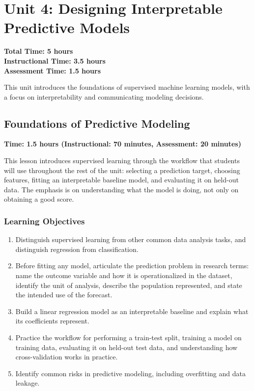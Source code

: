 \chapter{Unit 4: Designing Interpretable Predictive Models}
\label{chap:unit4}

\textbf{Total Time: 5 hours} \\
\textbf{Instructional Time: 3.5 hours} \\
\textbf{Assessment Time: 1.5 hours}

This unit introduces the foundations of supervised machine learning models, with a focus on interpretability and communicating modeling decisions.

\section{Foundations of Predictive Modeling}
\label{sec:4.1}

\textbf{Time: 1.5 hours (Instructional: 70 minutes, Assessment: 20 minutes)}

\noindent This lesson introduces supervised learning through the workflow that students will use throughout the rest of the unit: selecting a prediction target, choosing features, fitting an interpretable baseline model, and evaluating it on held-out data. The emphasis is on understanding what the model is doing, not only on obtaining a good score.

\subsection{Learning Objectives}

\begin{enumerate}
    \item Distinguish supervised learning from other common data analysis tasks, and distinguish regression from classification.
    \item Before fitting any model, articulate the prediction problem
    in research terms: name the outcome variable and how it is
    operationalized in the dataset, identify the unit of analysis,
    describe the population represented, and state the intended use
    of the forecast.
    \item Build a linear regression model as an interpretable baseline and explain what its coefficients represent.
    \item Practice the workflow for performing a train-test split, training a model on training data, evaluating it on held-out test data, and understanding how cross-validation works in practice.
    \item Identify common risks in predictive modeling, including overfitting and data leakage.
\end{enumerate}

